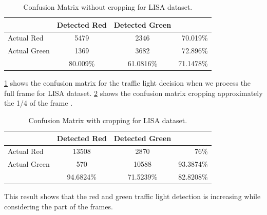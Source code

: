 \begin{table}[h!]
  \centering
  \caption{Confusion Matrix without cropping for LISA dataset.}
  \label{t:lisa_con_nocrp}
  \begin{tabular}{  l  c  c  r }
    \rowcolor{gray!50}   
     & Detected Red & Detected Green &  \\
    \hline
    Actual Red & 5479 & 2346 & 70.019\% \\
    Actual Green & 1369 & 3682 & 72.896\% \\
    \hline
    & 80.009\% & 61.0816\% & 71.1478\% \\
    
  \end{tabular}
\end{table}

\ref{t:lisa_con_nocrp} shows the confusion matrix for the traffic light decision when we process the full frame for LISA dataset.
\ref{t:lisa_con_crp} shows the confusion matrix cropping approximately the 1/4 of the frame .

\begin{table}[h!]
  \centering
  \caption{Confusion Matrix with cropping for LISA dataset.}
  \label{t:lisa_con_crp}
  \begin{tabular}{  l  c  c  r }
    \rowcolor{gray!50}   
     & Detected Red & Detected Green &  \\
    \hline
    Actual Red & 13508 & 2870 & 76\% \\
    Actual Green & 570 & 10588 & 93.3874\% \\
    \hline
    & 94.6824\% & 71.5239\% & 82.8208\% \\
    
  \end{tabular}
\end{table}

This result shows that the red and green traffic light detection is increasing while considering the part of the frames.

